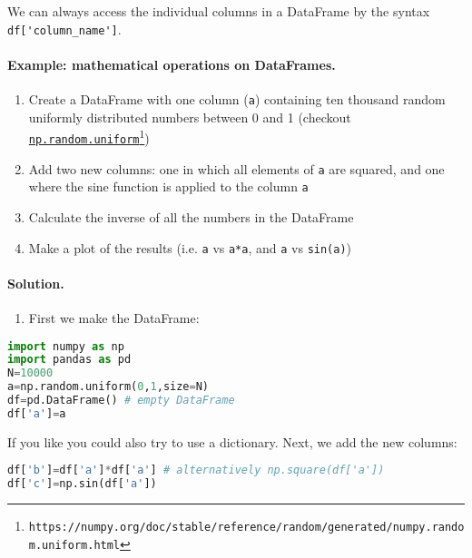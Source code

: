 \documentclass[graybox,sectrefs,envcountresetchap,open=right,final]{svmonodo}
\begin{document}
We can always access the individual columns in a DataFrame by the syntax \Verb!df['column_name']!. 
\paragraph{Example: mathematical operations on DataFrames.}
\begin{enumerate}
\item Create a DataFrame with one column (\texttt{a}) containing ten thousand random uniformly distributed numbers between 0 and 1 (checkout \href{{https://numpy.org/doc/stable/reference/random/generated/numpy.random.uniform.html}}{\nolinkurl{np.random.uniform}\footnote{\texttt{https://numpy.org/doc/stable/reference/random/generated/numpy.random.uniform.html}}})

\item Add two new columns: one in which all elements of \texttt{a} are squared, and one where the sine function is applied to the column \texttt{a}

\item Calculate the inverse of all the numbers in the DataFrame

\item Make a plot of the results (i.e. \texttt{a} vs \texttt{a*a}, and \texttt{a} vs \texttt{sin(a)})
\end{enumerate}

\noindent
\paragraph{Solution.}
\begin{enumerate}
\item First we make the DataFrame:
\end{enumerate}

\noindent







\begin{lstlisting}[language=python,style=blue1bar]
import numpy as np
import pandas as pd
N=10000
a=np.random.uniform(0,1,size=N)
df=pd.DataFrame() # empty DataFrame
df['a']=a

\end{lstlisting}

If you like you could also try to use a dictionary. Next, we add the new columns:



\begin{lstlisting}[language=python,style=blue1bar]
df['b']=df['a']*df['a'] # alternatively np.square(df['a'])
df['c']=np.sin(df['a'])

\end{lstlisting}
\end{document}
